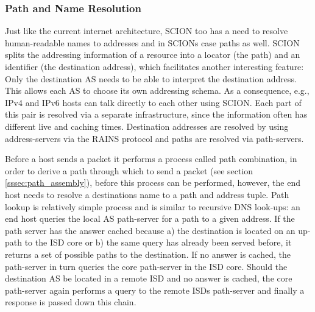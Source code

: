 \documentclass[../eva1_scion.tex]{subfiles}
\begin{document}
    \subsubsection{Path and Name Resolution}
   Just like the current internet architecture, SCION too has a need to resolve human-readable names to addresses and in SCIONs case paths as well. SCION splits the addressing information of a resource into a locator (the path) and an identifier (the destination address), which facilitates another interesting feature: Only the destination AS needs to be able to interpret the destination address. This allows each AS to choose its own addressing schema. As a consequence, e.g., IPv4 and IPv6 hosts can talk directly to each other using SCION. \cite{scion_2015} Each part of this pair is resolved via a separate infrastructure, since the information often has different live and caching times. Destination addresses are resolved by using address-servers via the RAINS protocol and paths are resolved via path-servers.

    Before a host sends a packet it performs a process called path combination, in order to derive a path through which to send a packet (see section \ref{sssec:path_assembly}), before this process can be performed, however, the end host needs to resolve a destinations name to a path and address tuple. Path lookup is relatively simple process and is similar to recursive DNS look-ups: an end host queries the local AS path-server for a path to a given address. If the path server has the answer cached because a) the destination is located on an up-path to the ISD core or b) the same query has already been served before, it returns a set of possible paths to the destination. If no answer is cached, the path-server in turn queries the core path-server in the ISD core. Should the destination AS be located in a remote ISD and no answer is cached, the core path-server again performs a query to the remote ISDs path-server and finally a response is passed down this chain. \cite{scion_2011}
\end{document}
